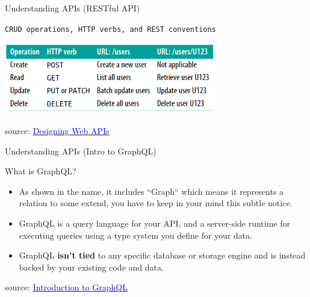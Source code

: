 \documentclass{beamer}
\begin{document}
\begin{frame}[t, label=crud-ops]{Understanding APIs \small (RESTful API)}
	
	\center \scriptsize \texttt{CRUD operations, HTTP verbs, and REST conventions}
	\begin{center}
      \includegraphics[width=0.7\textwidth, height=0.4\textheight]{img/crud.png}
    \end{center}
  
  \vspace{10mm}
  \tiny { source: \href{https://www.oreilly.com/library/view/designing-web-apis/9781492026914/}
  		{\textcolor{blue}{Designing Web APIs}}}
  
\end{frame}


\begin{frame}[t]{Understanding APIs \small (Intro to GraphQL)}
	\begin{block}{What is GraphQL?}
	\scriptsize
		\begin{itemize}
			\item<1-> As shown in the name, it includes ``Graph`` which means it represents a relation to some extend, you have to keep in your mind this subtle notice.
			\item<2-> GraphQL is a query language for your API, and a server-side runtime for executing queries using a type system you define for your data. 
			\item<3-> GraphQL \textbf{isn't tied} to any specific database or storage engine and is instead backed by your existing code and data.		
		\end{itemize}
	\end{block}
	
	\vspace{40mm}
	\tiny { source: \href{https://graphql.org/learn/}{\textcolor{blue}{Introduction to GraphQL}}}
\end{frame}
\end{document}
